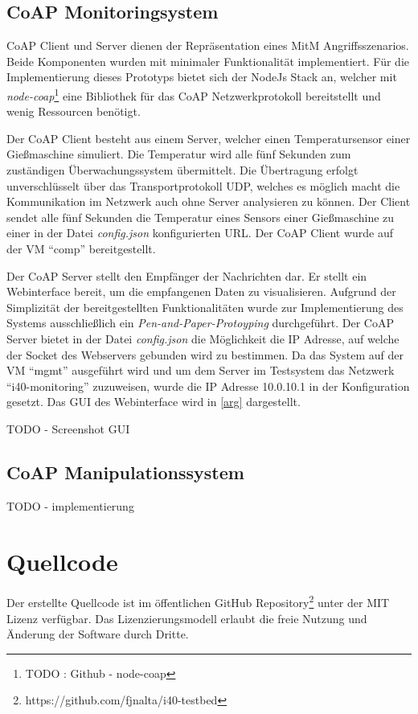 \subsection{\ac{CoAP} Monitoringsystem}
\ac{CoAP} Client und Server dienen der Repräsentation eines \ac{MitM} Angriffsszenarios. Beide Komponenten wurden mit minimaler Funktionalität implementiert. Für die Implementierung dieses Prototyps bietet sich der NodeJs Stack an, welcher mit \textit{node-coap}\footnote{TODO : Github - node-coap} eine Bibliothek für das \ac{CoAP} Netzwerkprotokoll bereitstellt und wenig Ressourcen benötigt.

Der \ac{CoAP} Client besteht aus einem Server, welcher einen Temperatursensor einer Gießmaschine simuliert. Die Temperatur wird alle fünf Sekunden zum zuständigen Überwachungssystem übermittelt. Die Übertragung erfolgt unverschlüsselt über das Transportprotokoll \ac{UDP}, welches es möglich macht die Kommunikation im Netzwerk auch ohne Server analysieren zu können. Der Client sendet alle fünf Sekunden die Temperatur eines Sensors einer Gießmaschine zu einer in der Datei \textit{config.json} konfigurierten \ac{URL}. Der \ac{CoAP} Client wurde auf der \ac{VM} "`comp"' bereitgestellt.

Der \ac{CoAP} Server stellt den Empfänger der Nachrichten dar. Er stellt ein Webinterface bereit, um die empfangenen Daten zu visualisieren. Aufgrund der Simplizität der bereitgestellten Funktionalitäten wurde zur Implementierung des Systems ausschließlich ein \textit{Pen-and-Paper-Protoyping} durchgeführt. Der \ac{CoAP} Server bietet in der Datei \textit{config.json} die Möglichkeit die \ac{IP} Adresse, auf welche der Socket des Webservers gebunden wird zu bestimmen. Da das System auf der \ac{VM} "`mgmt"' ausgeführt wird und um dem Server im Testsystem das Netzwerk "`i40-monitoring"' zuzuweisen, wurde die \ac{IP} Adresse 10.0.10.1 in der Konfiguration gesetzt. Das \ac{GUI} des Webinterface wird in \autoref{arg} dargestellt.

TODO - Screenshot GUI

\subsection{\ac{CoAP} Manipulationssystem}
TODO - implementierung

\section{Quellcode}
Der erstellte Quellcode ist im öffentlichen GitHub Repository\footnote{https://github.com/fjnalta/i40-testbed} unter der \ac{MIT} Lizenz verfügbar. Das Lizenzierungsmodell erlaubt die freie Nutzung und Änderung der Software durch Dritte.

